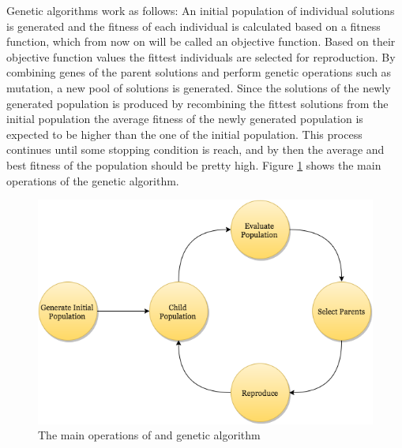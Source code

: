 Genetic algorithms work as follows: An initial population of individual solutions is generated and the fitness of each individual is calculated based on a fitness function, which from now on will be called an objective function. Based on their objective function values the fittest individuals are selected for reproduction. By combining genes of the parent solutions and perform genetic operations such as mutation, a new pool of solutions is generated. Since the solutions of the newly generated population is produced by recombining the fittest solutions from the initial population the average fitness of the newly generated population is expected to be higher than the one of the initial population. This process continues until some stopping condition is reach, and by then the average and best fitness of the population should be pretty high. Figure \ref{GA Flow chart} shows the main operations of the genetic algorithm.


\begin{figure}[h!]
\begin{center}
\includegraphics[scale=0.5]{images/GA}
\caption{The main operations of and genetic algorithm}
\end{center}
\label{GA Flow chart}
\end{figure}


